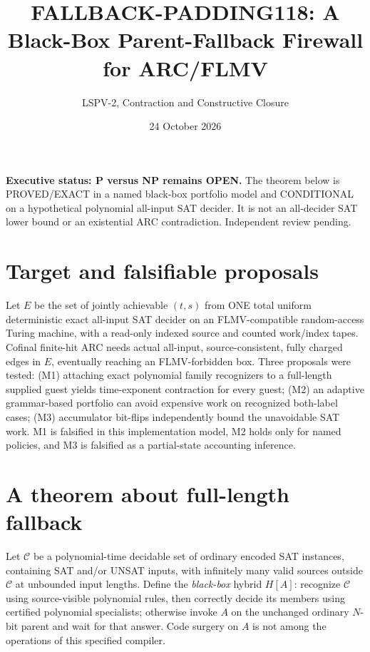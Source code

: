 \documentclass[11pt]{article}
\title{FALLBACK-PADDING118: A Black-Box Parent-Fallback Firewall for ARC/FLMV}
\author{LSPV-2, Contraction and Constructive Closure}
\date{24 October 2026}
\begin{document}
\maketitle
\noindent\textbf{Executive status: P versus NP remains OPEN.} The theorem below is PROVED/EXACT in a named black-box portfolio model and CONDITIONAL on a hypothetical polynomial all-input SAT decider. It is not an all-decider SAT lower bound or an existential ARC contradiction. Independent review pending.

\section{Target and falsifiable proposals}
Let $E$ be the set of jointly achievable $(t,s)$ from ONE total uniform deterministic exact all-input SAT decider on an FLMV-compatible random-access Turing machine, with a read-only indexed source and counted work/index tapes. Cofinal finite-hit ARC needs actual all-input, source-consistent, fully charged edges in $E$, eventually reaching an FLMV-forbidden box. Three proposals were tested: (M1) attaching exact polynomial family recognizers to a full-length supplied guest yields time-exponent contraction for every guest; (M2) an adaptive grammar-based portfolio can avoid expensive work on recognized both-label cases; (M3) accumulator bit-flips independently bound the unavoidable SAT work. M1 is falsified in this implementation model, M2 holds only for named policies, and M3 is falsified as a partial-state accounting inference.

\section{A theorem about full-length fallback}
Let $\mathcal C$ be a polynomial-time decidable set of ordinary encoded SAT instances, containing SAT and/or UNSAT inputs, with infinitely many valid sources outside $\mathcal C$ at unbounded input lengths. Define the \emph{black-box} hybrid $H[A]$: recognize $\mathcal C$ using source-visible polynomial rules, then correctly decide its members using certified polynomial specialists; otherwise invoke $A$ on the unchanged ordinary $N$-bit parent and wait for that answer. Code surgery on $A$ is not among the operations of this specified compiler.
\end{document}
